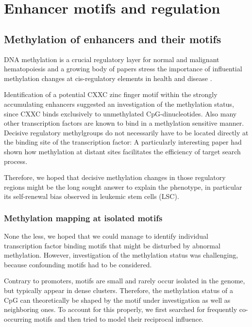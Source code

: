 \chapter{Enhancer motifs and regulation} 
\label{chap:r:enhancers:motifs}

\section{Methylation of enhancers and their motifs}
\label{chap:r:enhancers:motifs:methylation}

DNA methylation is a crucial regulatory layer for normal and malignant hematopoiesis and a growing body of papers stress the importance of influential methylation changes at cis-regulatory elements in health and disease \cite{Stadler2011,Hon2013,Kieffer-Kwon2013,Schlesinger2013,Varley2013,Sheaffer2014}. 

Identification of a potential CXXC zinc finger motif within the strongly accumulating enhancers suggested an investigation of the methylation status, since CXXC binds exclusively to unmethylated CpG-dinucleotides\cite{Allen2006}. Also many other transcription factors are known to bind in a methylation sensitive manner\cite{Hu2013,Yin2017a}. Decisive regulatory methylgroups do not necessarily have to be located directly at the binding site of the transcription factor: A particularly interesting paper had shown how methylation at distant sites facilitates the efficiency of  target search process\cite{Kemme2017}. 

Therefore, we hoped that decisive methylation changes in those regulatory regions might be the long sought answer to explain the \dnmtchip phenotype, in particular its self-renewal bias observed in leukemic stem cells (LSC)\cite{Vockentanz2011}. 

\subsection{Methylation mapping at isolated motifs}
\label{chap:r:enhancers:motifs:methylation:motifs} 

None the less, we hoped that we could manage to identify individual transcription factor binding motifs that might be disturbed by abnormal methylation. However, investigation of the methylation status was challenging, because confounding motifs had to be considered. 

Contrary to promoters, motifs are small and rarely occur isolated in the genome, but typically appear in dense clusters. Therefore, the methylation status of a CpG can theoretically be shaped by the motif under investigation as well as neighboring ones. To account for this properly, we first searched for frequently co-occurring motifs and then tried to model their reciprocal influence. 

